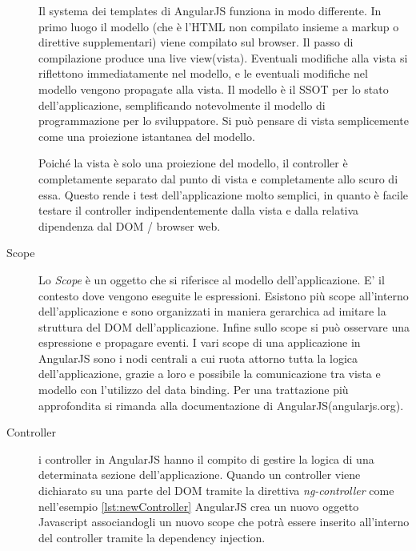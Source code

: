 \begin{description}
Il systema dei templates di AngularJS funziona in modo differente. In primo luogo il modello (che è l'HTML non compilato insieme a  markup o direttive supplementari) viene compilato sul browser. Il passo di compilazione produce una live view(vista). Eventuali modifiche alla vista si riflettono immediatamente nel modello, e le eventuali modifiche nel modello vengono propagate alla vista. Il modello è il SSOT per lo stato dell'applicazione, semplificando notevolmente il modello di programmazione per lo sviluppatore. Si può pensare di vista semplicemente come una proiezione istantanea del modello.

Poiché la vista è solo una proiezione del modello, il controller è completamente separato dal punto di vista e completamente allo scuro di essa. Questo rende i test dell'applicazione molto semplici, in quanto è facile testare il controller indipendentemente dalla vista e dalla relativa dipendenza dal DOM / browser web.

\item[Scope] Lo \emph{Scope} è un oggetto che si riferisce al modello dell'applicazione. E' il contesto dove vengono eseguite le espressioni. Esistono più scope all'interno dell'applicazione e sono organizzati in maniera gerarchica ad imitare la struttura del DOM dell'applicazione. Infine sullo scope si può osservare una espressione e propagare eventi.
I vari scope di una applicazione in AngularJS sono i nodi centrali a cui ruota attorno tutta la logica dell'applicazione, grazie a loro e possibile la comunicazione tra vista e modello con l'utilizzo del data binding. Per una trattazione più approfondita si rimanda alla documentazione di AngularJS(angularjs.org).

\item[Controller] i controller in AngularJS hanno il compito di gestire la logica di una determinata sezione dell'applicazione. Quando un controller viene dichiarato su una parte del DOM tramite la direttiva \emph{ng-controller} come nell'esempio \ref{lst:newController} AngularJS crea un nuovo oggetto Javascript associandogli un nuovo scope che potrà essere inserito all'interno del controller tramite la dependency injection. 


\end{description}

